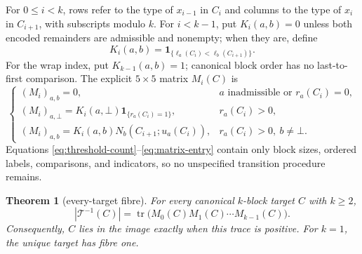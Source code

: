 \documentclass[a4paper,10pt]{amsart}
\newtheorem{theorem}{Theorem}
\theoremstyle{definition}
\theoremstyle{remark}
\newcommand{\T}{\mathcal T}
\newcommand{\ind}{\mathbf 1}
\newcommand{\tr}{\operatorname{tr}}
\newcommand{\botstate}{\bot}
\begin{document}
For $0\le i<k$, rows refer to the type of $x_{i-1}$ in $C_i$ and columns to
the type of $x_i$ in $C_{i+1}$, with subscripts modulo $k$.  For $i<k-1$,
put $K_i(a,b)=0$ unless both encoded remainders are admissible and nonempty;
when they are, define
\begin{equation}\label{eq:order-indicator}
 K_i(a,b)=\ind_{\{\ell_a(C_i)<\ell_b(C_{i+1})\}}.
\end{equation}
For the wrap index, put $K_{k-1}(a,b)=1$; canonical block order has no
last-to-first comparison.  The explicit $5\times5$ matrix $M_i(C)$ is
\begin{equation}\label{eq:matrix-entry}
 \boxed{
 \begin{cases}
 (M_i)_{a,b}=0,
   &a\text{ inadmissible or }r_a(C_i)=0,\\
 (M_i)_{a,\botstate}=K_i(a,\botstate)
       \ind_{\{r_a(C_i)=1\}},&r_a(C_i)>0,\\
 (M_i)_{a,b}=K_i(a,b)N_b(C_{i+1};u_a(C_i)),
       &r_a(C_i)>0,\ b\ne\botstate.
 \end{cases}}
\end{equation}
Equations \eqref{eq:threshold-count}--\eqref{eq:matrix-entry} contain only block sizes,
ordered labels, comparisons, and indicators, so no unspecified transition
procedure remains.

\begin{theorem}[every-target fibre]\label{thm:fibre}
For every canonical $k$-block target $C$ with $k\ge2$,
\begin{equation}\label{eq:trace}
 \boxed{\qquad |\T^{-1}(C)|=
 \tr\bigl(M_0(C)M_1(C)\cdots M_{k-1}(C)\bigr).\qquad}
\end{equation}
Consequently, $C$ lies in the image exactly when this trace is positive.  For
$k=1$, the unique target has fibre one.
\end{theorem}
\end{document}
